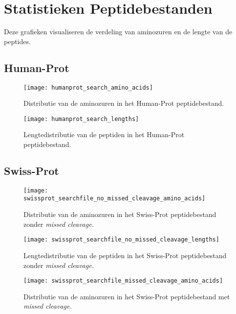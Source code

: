 \chapter{Statistieken Peptidebestanden}\label{ch:appendix-statistieken-peptidebestanden}
Deze grafieken visualiseren de verdeling van aminozuren en de lengte van de peptides.

\section{Human-Prot}\label{sec:human-prot-stats}
\begin{figure}[H]
    \centering
    \texttt{[image: humanprot\_search\_amino\_acids]}
    \caption{Distributie van de aminozuren in het Human-Prot peptidebestand.}
    \label{fig:humanprot_search_amino_acids}
\end{figure}

\begin{figure}[H]
    \centering
    \texttt{[image: humanprot\_search\_lengths]}
    \caption{Lengtedistributie van de peptiden in het Human-Prot peptidebestand.}
    \label{fig:humanprot_search_distr}
\end{figure}

\section{Swiss-Prot}\label{sec:swiss-prot-stats}
\begin{figure}[H]
    \centering
    \texttt{[image: swissprot\_searchfile\_no\_missed\_cleavage\_amino\_acids]}
    \caption{Distributie van de aminozuren in het Swiss-Prot peptidebestand zonder \textit{missed cleavage.}}
    \label{fig:swissprot_search_no_missed_cleavage_amino_acids}
\end{figure}

\begin{figure}[H]
    \centering
    \texttt{[image: swissprot\_searchfile\_no\_missed\_cleavage\_lengths]}
    \caption{Lengtedistributie van de peptiden in het Swiss-Prot peptidebestand zonder \textit{missed cleavage.}}
    \label{fig:swissprot_search_no_missed_cleavage_distr}
\end{figure}

\begin{figure}[H]
    \centering
    \texttt{[image: swissprot\_searchfile\_missed\_cleavage\_amino\_acids]}
    \caption{Distributie van de aminozuren in het Swiss-Prot peptidebestand met \textit{missed cleavage.}}
    \label{fig:swissprot_search_missed_cleavage_amino_acids}
\end{figure}

